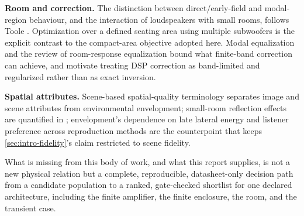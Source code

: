 \textbf{Room and correction.} The distinction between direct/early-field
and modal-region behaviour, and the interaction of loudspeakers with small
rooms, follows Toole \cite{toole2006}. Optimization over a defined seating
area using multiple subwoofers \cite{welti2006} is the explicit contrast to
the compact-area objective adopted here. Modal equalization
\cite{makivirta2003} and the review of room-response equalization
\cite{cecchi2018} bound what finite-band correction can achieve, and
motivate treating DSP correction as band-limited and regularized rather
than as exact inversion.

\textbf{Spatial attributes.} Scene-based spatial-quality terminology
\cite{rumsey2002} separates image and scene attributes from environmental
envelopment; small-room reflection effects are quantified in
\cite{bech1998}; envelopment's dependence on late lateral energy
\cite{bradley1995} and listener preference across reproduction methods
\cite{francombe2017} are the counterpoint that keeps
\cref{sec:intro-fidelity}'s claim restricted to scene fidelity.

What is missing from this body of work, and what this report supplies, is
not a new physical relation but a complete, reproducible, datasheet-only
decision path from a candidate population to a ranked, gate-checked
shortlist for one declared architecture, including the finite amplifier,
the finite enclosure, the room, and the transient case.
